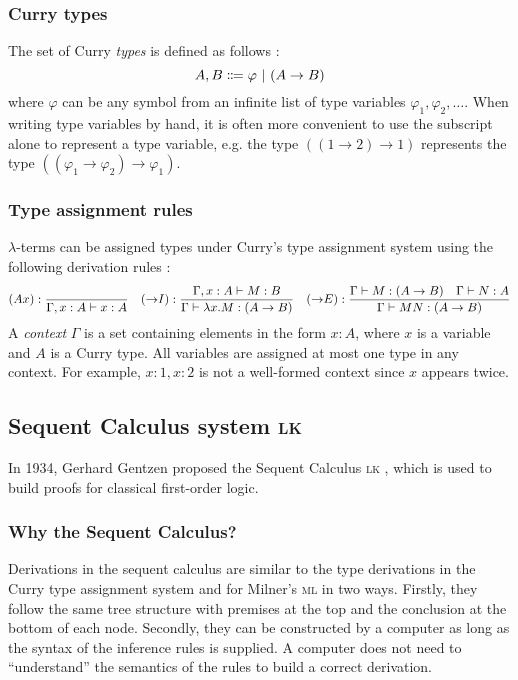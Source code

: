 \subsubsection{Curry types}
\label{lambda:curry-types}
The set of Curry \textit{types} is defined as follows \cite{van-bakel:2022}:
\[
    A, B \Coloneqq \varphi \ |\  (A \rightarrow B)
\]
where $\varphi$ can be any symbol from an infinite list of type variables $\varphi_1, \varphi_2, \ldots$. When writing type variables by hand, it is often more convenient to use the subscript alone to represent a type variable, e.g. the type $((1 \rightarrow 2) \rightarrow 1)$ represents the type $((\varphi_1 \rightarrow \varphi_2) \rightarrow \varphi_1)$.

\subsubsection{Type assignment rules}
\label{lambda:type-assignment}
$\lambda$-terms can be assigned types under Curry's type assignment system using the following derivation rules \cite{van-bakel:2022}:
{   
    \derivationfont 
    \[
        (Ax): \frac{}{\Gamma, x:A \vdash x:A} \quad (\mathord{\to} I): \frac{\Gamma, x:A \vdash M:B}{\Gamma \vdash \lambda x. M: (A \to B)} \quad (\mathord{\to} E): \frac{\Gamma \vdash M: (A \to B) \quad \Gamma \vdash N: A}{\Gamma \vdash MN: (A \to B)}
    \]
}%
A \textit{context} $\Gamma$ is a set containing elements in the form $x:A$, where $x$ is a variable and $A$ is a Curry type. All variables are assigned at most one type in any context. For example, $x:1, x:2$ is not a well-formed context since $x$ appears twice.

\subsection{Sequent Calculus system \textsc{lk}} 
In 1934, Gerhard Gentzen proposed the Sequent Calculus \textsc{lk} \cite{gentzen:1969}, which is used to build proofs for classical first-order logic.

\subsubsection{Why the Sequent Calculus?}
Derivations in the sequent calculus are similar to the type derivations in the Curry type assignment system and for Milner's \textsc{ml} in two ways. Firstly, they follow the same tree structure with premises at the top and the conclusion at the bottom of each node. Secondly, they can be constructed by a computer as long as the syntax of the inference rules is supplied. A computer does not need to ``understand'' the semantics of the rules to build a correct derivation.

